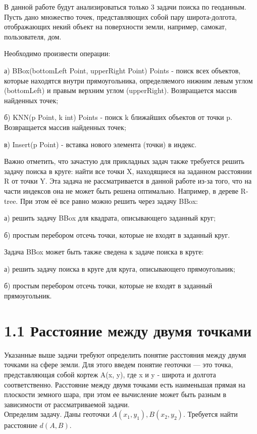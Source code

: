 \label{cha:analysis}

В данной работе будут анализироваться только 3 задачи поиска по геоданным. Пусть дано множество точек, представляющих собой пару широта-долгота, отображающих некий объект на поверхности земли, например, самокат, пользователя, дом. 

Необходимо произвести операции:
\par а) BBox(bottomLeft Point, upperRight Point) Points - поиск всех объектов, которые находятся внутри прямоугольника, определяемого нижним левым углом (bottomLeft) и правым верхним углом (upperRight). Возвращается массив найденных точек;
\par б) KNN(p Point, k int) Points - поиск k ближайших объектов от точки p. Возвращается массив найденных точек;
\par в) Insert(p Point) - вставка нового элемента (точки) в индекс. 

Важно отметить, что зачастую для прикладных задач также требуется решить задачу поиска в круге: найти все точки X, находящиеся на заданном расстоянии R от точки Y. Эта задача не рассматривается в данной работе из-за того, что на части индексов она не может быть решена оптимально. Например, в дереве R-tree. При этом её все равно можно решить через задачу BBox: 
\par а) решить задачу BBox для квадрата, описывающего заданный круг;
\par б) простым перебором отсечь точки, которые не входят в заданный круг.

Задача BBox может быть также сведена к задаче поиска в круге:
\par а) решить задачу поиска в круге для круга, описывающего прямоугольник;
\par б) простым перебором отсечь точки, которые не входят в заданный прямоугольник.

\section{1.1 Расстояние между двумя точками}
Указанные выше задачи требуют определить понятие расстояния между двумя точками на сфере земли. Для этого введем понятие геоточки --- это точка, представляющая собой кортеж A(x, y), где x и y - широта и долгота соответственно. 
Расстояние между двумя точками есть наименьшая прямая на плоскости земного шара, при этом ее вычисление может быть разным в зависимости от рассматриваемой задачи. \\
Определим задачу. Даны геоточки $A(x_1, y_1), B(x_2, y_2)$. Требуется найти расстояние $d(A, B)$.

